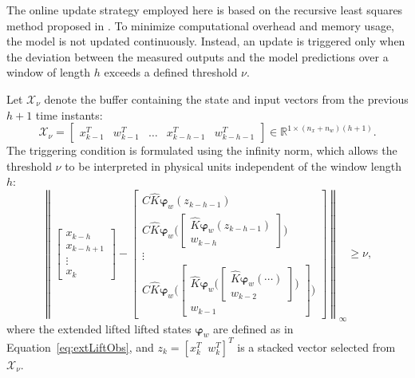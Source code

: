 The online update strategy employed here is based on the recursive least squares method proposed in \cite{cisneros2020data}. To minimize computational overhead and memory usage, the model is not updated continuously. Instead, an update is triggered only when the deviation between the measured outputs and the model predictions over a window of length $h$ exceeds a defined threshold $\nu$.

Let $\mathcal{X}_{\nu}$ denote the buffer containing the state and input vectors from the previous $h+1$ time instants:
\[
\mathcal{X}_{\nu} = \begin{bmatrix} x_{k-1}^T & w_{k-1}^T & \dots & x_{k-h-1}^T & w_{k-h-1}^T \end{bmatrix} \in \mathbb{R}^{1 \times (n_x + n_w)(h+1)}.
\]
The triggering condition is formulated using the infinity norm, which allows the threshold $\nu$ to be interpreted in physical units independent of the window length $h$:
\begin{equation} \label{eq:add_data}
    \left\|
    \begin{bmatrix}
        x_{k-h} \\
        x_{k-h+1} \\
        \vdots \\
        x_{k}
    \end{bmatrix}
    -
    \begin{bmatrix}
        C\hat{K}\bm{\varphi}_w(z_{k-h-1}) \\[2mm]
        C\hat{K}\bm{\varphi}_w\Big(
        \begin{bmatrix}
            \hat{K}\bm{\varphi}_w(z_{k-h-1}) \\
            w_{k-h}
        \end{bmatrix}
        \Big) \\[1mm]
        \vdots \\[1mm]
        C\hat{K}\bm{\varphi}_w\Big(
        \begin{bmatrix}
            \hat{K}\bm{\varphi}_w\Big(
            \begin{bmatrix}
                \hat{K}\bm{\varphi}_w(\cdots) \\
                w_{k-2}
            \end{bmatrix}
            \Big) \\
            w_{k-1}
        \end{bmatrix}
        \Big)
    \end{bmatrix}
    \right\|_\infty \geq \nu,
\end{equation}
where the extended lifted lifted states $\bm{\varphi}_w$ are defined as in Equation~\eqref{eq:extLiftObs}, and $z_k = [x_k^T \;\; w_k^T]^T$ is a stacked vector selected from $\mathcal{X}_{\nu}$.

